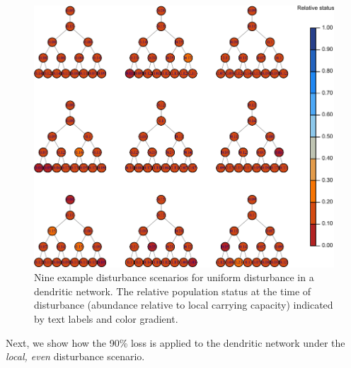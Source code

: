 \documentclass[
]{article}
\begin{document}
\begin{figure}[H]

{\centering \includegraphics{Managing_for_ecological_surprises_in_metapopulations_files/figure-latex/example uniform spatial disturbance-1} 

}

\caption{Nine example disturbance scenarios for uniform disturbance in a dendritic network. The relative population status at the time of disturbance (abundance relative to local carrying capacity) indicated by text labels and color gradient.}\label{fig:example uniform spatial disturbance}
\end{figure}
\newpage

Next, we show how the 90\% loss is applied to the dendritic network
under the \emph{local, even} disturbance scenario.
\end{document}
